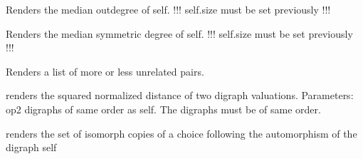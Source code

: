 \documentclass[letterpaper,10pt,english]{sphinxmanual}
\begin{document}
\begin{fulllineitems}
\begin{fulllineitems}
\end{fulllineitems}


\begin{fulllineitems}
\label{techDoc:digraphs.Digraph.computeMedianOutDegree}
Renders the median outdegree of self.
!!! self.size must be set previously !!!

\end{fulllineitems}


\begin{fulllineitems}
\label{techDoc:digraphs.Digraph.computeMedianSymDegree}
Renders the median symmetric degree of self.
!!! self.size must be set previously !!!

\end{fulllineitems}


\begin{fulllineitems}
\label{techDoc:digraphs.Digraph.computeMoreOrLessUnrelatedPairs}
Renders a list of more or less unrelated pairs.

\end{fulllineitems}


\begin{fulllineitems}
\label{techDoc:digraphs.Digraph.computeODistance}
renders the squared normalized distance of
two digraph valuations.
Parameters: op2 digraphs of same order as self.
The digraphs must be of same order.

\end{fulllineitems}


\begin{fulllineitems}
\label{techDoc:digraphs.Digraph.computeOrbit}
renders the set of isomorph copies of a choice following
the automorphism of the digraph self


\end{fulllineitems}
\end{fulllineitems}
\end{document}
